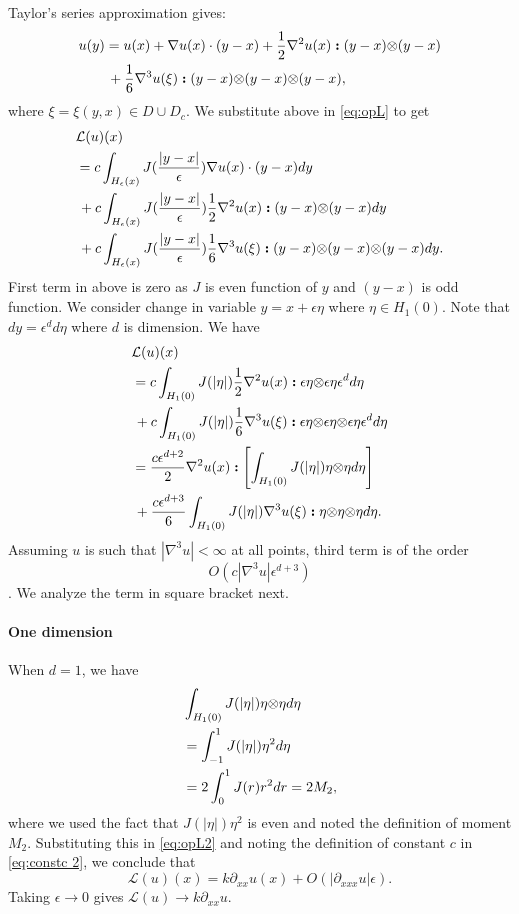 \documentclass[11pt,twocolumn]{amsart}
\theoremstyle{definition}
\theoremstyle{definition}
\numberwithin{equation}{section}
\numberwithin{equation}{section}
\newcommand{\calL}{\mathcal{L}}  %
\newcommand{\bcolon}{\boldsymbol{:}}
\newcommand{\dyad}{\mathbf{\otimes}}
\begin{document}
\begin{appendices}
Taylor's series approximation gives:
\begin{align*}
u(y) &= u(x) + \nabla u(x) \cdot (y-x) + \frac{1}{2} \nabla^2 u(x)\bcolon (y-x) \dyad (y-x) \notag \\
&\,+ \frac{1}{6} \nabla^3 u(\xi) \bcolon (y-x)\dyad (y-x) \dyad (y-x),
\end{align*}
where $\xi = \xi(y,x) \in D\cup D_c$. We substitute above in \autoref{eq:opL} to get
\begin{align*}
&\calL(u)(x) \notag \\
&= c \int_{H_\epsilon(x)}  J(\frac{|y-x|}{\epsilon}) \nabla u(x) \cdot (y-x) dy\notag \\
&\, +  c \int_{H_\epsilon(x)}  J(\frac{|y-x|}{\epsilon}) \frac{1}{2} \nabla^2 u(x)\bcolon (y-x) \dyad (y-x) dy \notag \\
&\, +  c \int_{H_\epsilon(x)}  J(\frac{|y-x|}{\epsilon}) \frac{1}{6} \nabla^3 u(\xi) \bcolon (y-x)\dyad (y-x) \dyad (y-x) dy.
\end{align*}
First term in above is zero as $J$ is even function of $y$ and $(y-x)$ is odd function. We consider change in variable $y = x + \epsilon \eta$ where $\eta \in H_1(0)$. Note that $dy = \epsilon^d d\eta$ where $d$ is dimension. We have
\begin{align}\label{eq:opL2}
&\calL(u)(x) \notag \\
&= c \int_{H_1(0)}  J(|\eta|) \frac{1}{2} \nabla^2 u(x)\bcolon \epsilon \eta \dyad \epsilon \eta  \epsilon^d d\eta \notag \\
&\, +  c \int_{H_1(0)}  J(|\eta|) \frac{1}{6} \nabla^3 u(\xi) \bcolon \epsilon \eta \dyad \epsilon \eta \dyad \epsilon \eta  \epsilon^d d\eta \notag \\
&= \frac{c\epsilon^{d+2}}{2}  \nabla^2 u(x) \bcolon \left[ \int_{H_1(0)}  J(|\eta|) \eta \dyad \eta d\eta \right] \notag \\
&\, + \frac{c\epsilon^{d+3}}{6} \int_{H_1(0)}  J(|\eta|) \nabla^3 u(\xi) \bcolon \eta \dyad\eta \dyad\eta d\eta .
\end{align}
Assuming $u$ is such that $|\nabla^3 u| < \infty$ at all points, third term is of the order $$O(c|\nabla^3 u| \epsilon^{d+3})$$. We analyze the term in square bracket next. 

\paragraph{One dimension} When $d=1$, we have
\begin{align}
&\int_{H_1(0)}  J(|\eta|) \eta \dyad \eta d\eta\notag \\
&=\int_{-1}^1 J(|\eta|) \eta^2 d\eta \notag \\
&= 2\int_0^1 J(r) r^2 dr = 2 M_2,
\end{align}
where we used the fact that $J(|\eta|) \eta^2$ is even and noted the definition of moment $M_2$. Substituting this in \autoref{eq:opL2} and noting the definition of constant $c$ in \autoref{eq:constc 2}, we conclude that
$$
\calL(u)(x) = k \partial_{xx} u(x) + O(|\partial_{xxx}u| \epsilon).
$$
Taking $\epsilon \to 0$ gives $\calL(u) \to k\partial_{xx} u$.


\end{appendices}
\end{document}
